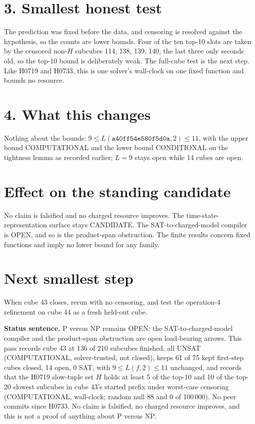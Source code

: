\documentclass[11pt]{article}
\begin{document}
\section*{3. Smallest honest test}
The prediction was fixed before the data, and censoring is resolved against the hypothesis, so the counts are lower bounds. Four of the ten top-10 slots are taken by the censored non-$H$ subcubes 114, 138, 139, 140, the last three only seconds old, so the top-10 bound is deliberately weak. The full-cube test is the next step. Like H0719 and H0733, this is one solver's wall-clock on one fixed function and bounds no resource.

\section*{4. What this changes}
Nothing about the bounds: $9\le L(\texttt{a40ff54e580f5d0a},2)\le 11$, with the upper bound COMPUTATIONAL and the lower bound CONDITIONAL on the tightness lemma as recorded earlier; $L=9$ stays open while 14 cubes are open.

\section*{Effect on the standing candidate}
No claim is falsified and no charged resource improves. The time-state-representation surface stays CANDIDATE. The SAT-to-charged-model compiler is OPEN, and so is the product-span obstruction. The finite results concern fixed functions and imply no lower bound for any family.

\section*{Next smallest step}
When cube 43 closes, rerun  with no censoring, and test the operation-4 refinement on cube 44 as a fresh held-out cube.

\bigskip
\noindent\textbf{Status sentence.} P versus NP remains OPEN: the SAT-to-charged-model compiler and the product-span obstruction are open load-bearing arrows. This pass records cube 43 at 136 of 210 subcubes finished, all UNSAT (COMPUTATIONAL, solver-trusted, not closed), keeps 61 of 75 kept first-step cubes closed, 14 open, 0 SAT, with $9\le L(f,2)\le 11$ unchanged, and records that the H0719 slow-tuple set $H$ holds at least 5 of the top-10 and 10 of the top-20 slowest subcubes in cube 43's started prefix under worst-case censoring (COMPUTATIONAL, wall-clock; random null 88 and 0 of 100\,000). No peer commits since H0733. No claim is falsified, no charged resource improves, and this is not a proof of anything about P versus NP.
\end{document}
